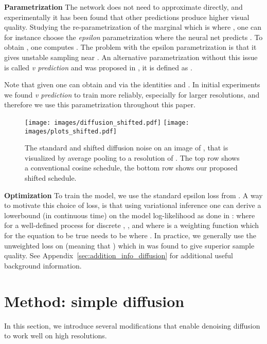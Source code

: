 \documentclass[nohyperref]{article}
\theoremstyle{plain}
\theoremstyle{definition}
\theoremstyle{remark}
\begin{document}
\textbf{Parametrization}
The network does not need to approximate  directly, and experimentally it has been found that other predictions produce higher visual quality. Studying the re-parametrization of the marginal  which is  where , one can for instance choose the \textit{epsilon} parametrization where the neural net predicts . To obtain , one computes . The problem with the epsilon parametrization is that it gives unstable sampling near . An alternative parametrization without this issue is called \textit{v prediction} and was proposed in \citep{salimans2022progressive}, it is defined as .

Note that given  one can obtain  and  via the identities  and  . In initial experiments we found \textit{v prediction} to train more reliably, especially for larger resolutions, and therefore we use this parametrization throughout this paper.

\begin{figure*}
    \centering
    \texttt{[image: images/diffusion\_shifted.pdf]}
    \texttt{[image: images/plots\_shifted.pdf]}
    \vspace{-.2cm}
    \caption{The standard and shifted diffusion noise on an image of , that is visualized by average pooling to a resolution of . The top row shows a conventional cosine schedule, the bottom row shows our proposed shifted schedule.}
    \label{fig:diffusion_shifted}
\end{figure*}

\textbf{Optimization}
To train the model, we use the standard epsilon loss from \citep{ho2020denoising}. A way to motivate this choice of loss, is that using variational inference one can derive a lowerbound (in continuous time) on the model log-likelihood as done in \citep{kingma2021vdm}:
\small\normalsize
where for a well-defined process  for discrete , , and where  is a weighting function which for the equation to be true needs to be  where . In practice, we generally use the unweighted loss on  (meaning that ) which in \citep{ho2020denoising} was found to give superior sample quality. See Appendix~\ref{sec:addition_info_diffusion} for additional useful background information.

 
\section{Method: simple diffusion}
In this section, we introduce several modifications that enable denoising diffusion to work well on high resolutions.
\end{document}
